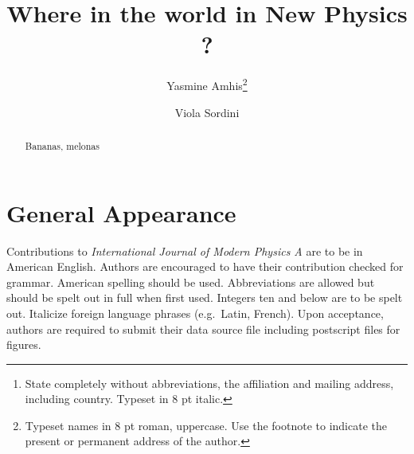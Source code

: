 \documentclass{ws-ijmpa}
\begin{document}

%
\catchline{}{}{}{}{}
%

\title{Where in the world in New Physics ?}

\author{Yasmine Amhis\footnote{
Typeset names in 8 pt roman, uppercase. Use the footnote to indicate the
present or permanent address of the author.}
}

\address{University Department, University Name, Address\\
City, State ZIP/Zone, Country\footnote{
State completely without abbreviations, the affiliation and
mailing address, including country. Typeset in 8 pt italic.}\\
first\_author@domain\_name}

\author{Viola Sordini}

\address{Group, Laboratory, Address\\
City, State ZIP/Zone, Country\\
second\_author@domain\_name}

\maketitle

\begin{history}
\end{history}

\begin{abstract}
Bananas, melonas

\end{abstract}



\section{General Appearance}	

Contributions to {\it International Journal of Modern Physics A}
are to be in American English. Authors are encouraged to have their
contribution checked for grammar. American spelling should be
used. Abbreviations are allowed but should be spelt out in full when
first used. Integers ten and below are to be spelt out.  Italicize
foreign language phrases (e.g.~Latin, French).  Upon acceptance,
authors are required to submit their data source file including
postscript files for figures.
\end{document}
